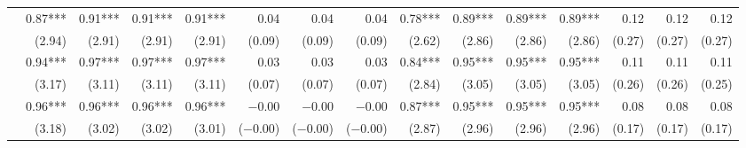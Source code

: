 \begin{tabularx}{1.45\textwidth}{lRRRRRRRRRRRRRR}
		 & \num{0.87}***\phantom{)} & \num{0.91}***\phantom{)} & \num{0.91}***\phantom{)} & \num{0.91}***\phantom{)} & \num{0.04}\phantom{***)} & \num{0.04}\phantom{***)} & \num{0.04}\phantom{***)} & \num{0.78}***\phantom{)} & \num{0.89}***\phantom{)} & \num{0.89}***\phantom{)} & \num{0.89}***\phantom{)} & \num{0.12}\phantom{***)} & \num{0.12}\phantom{***)} & \num{0.12}\phantom{***)} \\
		 & (\num{2.94})\phantom{***} & (\num{2.91})\phantom{***} & (\num{2.91})\phantom{***} & (\num{2.91})\phantom{***} & (\num{0.09})\phantom{***} & (\num{0.09})\phantom{***} & (\num{0.09})\phantom{***} & (\num{2.62})\phantom{***} & (\num{2.86})\phantom{***} & (\num{2.86})\phantom{***} & (\num{2.86})\phantom{***} & (\num{0.27})\phantom{***} & (\num{0.27})\phantom{***} & (\num{0.27})\phantom{***} \\ [\dspacing]
		 & \num{0.94}***\phantom{)} & \num{0.97}***\phantom{)} & \num{0.97}***\phantom{)} & \num{0.97}***\phantom{)} & \num{0.03}\phantom{***)} & \num{0.03}\phantom{***)} & \num{0.03}\phantom{***)} & \num{0.84}***\phantom{)} & \num{0.95}***\phantom{)} & \num{0.95}***\phantom{)} & \num{0.95}***\phantom{)} & \num{0.11}\phantom{***)} & \num{0.11}\phantom{***)} & \num{0.11}\phantom{***)} \\
		 & (\num{3.17})\phantom{***} & (\num{3.11})\phantom{***} & (\num{3.11})\phantom{***} & (\num{3.11})\phantom{***} & (\num{0.07})\phantom{***} & (\num{0.07})\phantom{***} & (\num{0.07})\phantom{***} & (\num{2.84})\phantom{***} & (\num{3.05})\phantom{***} & (\num{3.05})\phantom{***} & (\num{3.05})\phantom{***} & (\num{0.26})\phantom{***} & (\num{0.26})\phantom{***} & (\num{0.25})\phantom{***} \\ [\dspacing]
		 & \num{0.96}***\phantom{)} & \num{0.96}***\phantom{)} & \num{0.96}***\phantom{)} & \num{0.96}***\phantom{)} & \num{-0.00}\phantom{***)} & \num{-0.00}\phantom{***)} & \num{-0.00}\phantom{***)} & \num{0.87}***\phantom{)} & \num{0.95}***\phantom{)} & \num{0.95}***\phantom{)} & \num{0.95}***\phantom{)} & \num{0.08}\phantom{***)} & \num{0.08}\phantom{***)} & \num{0.08}\phantom{***)} \\
		 & (\num{3.18})\phantom{***} & (\num{3.02})\phantom{***} & (\num{3.02})\phantom{***} & (\num{3.01})\phantom{***} & (\num{-0.00})\phantom{***} & (\num{-0.00})\phantom{***} & (\num{-0.00})\phantom{***} & (\num{2.87})\phantom{***} & (\num{2.96})\phantom{***} & (\num{2.96})\phantom{***} & (\num{2.96})\phantom{***} & (\num{0.17})\phantom{***} & (\num{0.17})\phantom{***} & (\num{0.17})\phantom{***} \\ [\dspacing]

\end{tabularx}
